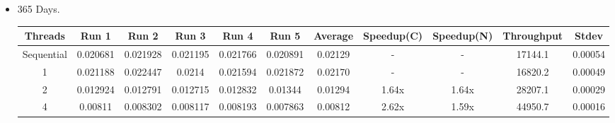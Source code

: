 \documentclass{article}
\begin{document}
\begin{itemize}
    \item 365 Days.
    \begin{center}
    \begin{adjustbox}{width=\columnwidth,center}
    \begin{tabular}{||c | c c c c c | c | c c | c c ||} 
    \hline
    Threads & Run 1 & Run 2 & Run 3 & Run 4 & Run 5 & Average & Speedup(C) & Speedup(N) & Throughput & Stdev \\ [0.5ex] 
    \hline\hline
    Sequential & 0.020681 & 0.021928 & 0.021195 & 0.021766 & 0.020891 & 0.02129 & - & - & 17144.1 & 0.00054\\ 
    \hline
    1 & 0.021188 & 0.022447 & 0.0214 & 0.021594 & 0.021872 & 0.02170  & - & - & 16820.2 & 0.00049\\ 
    \hline
    2 & 0.012924 & 0.012791 & 0.012715 & 0.012832 & 0.01344 & 0.01294 & 1.64x & 1.64x & 28207.1 &  0.00029\\ 
    \hline
    4 & 0.00811 & 0.008302 & 0.008117 & 0.008193 & 0.007863 & 0.00812 & 2.62x & 1.59x & 44950.7 & 0.00016\\ 
    \hline
    \end{tabular}
    \end{adjustbox}
    \end{center}
\end{itemize}    
\end{document}
